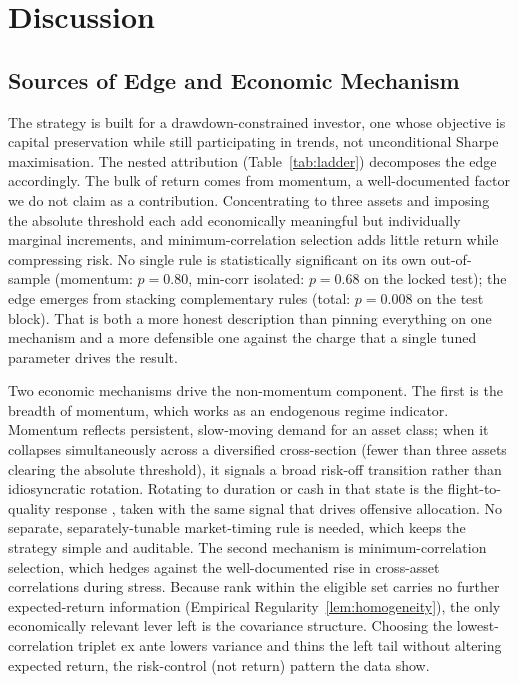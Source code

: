 \section{Discussion}
\label{sec:discussion}

\subsection{Sources of Edge and Economic Mechanism}

The strategy is built for a drawdown-constrained investor, one whose
objective is capital preservation while still participating in trends, not
unconditional Sharpe maximisation. The nested attribution
(Table~\ref{tab:ladder}) decomposes the edge accordingly. The bulk of return
comes from momentum, a well-documented factor we do not claim as a contribution.
Concentrating to three assets and imposing the absolute threshold each add
economically meaningful but individually marginal increments, and minimum-correlation
selection adds little return while compressing risk. No single
rule is statistically significant on its own out-of-sample (momentum: $p = 0.80$,
min-corr isolated: $p = 0.68$ on the locked test); the edge emerges from
stacking complementary rules (total: $p = 0.008$ on the test block). That
is both a more honest description than pinning everything on one mechanism and a
more defensible one against the charge that a single tuned parameter drives the result.

Two economic mechanisms drive the non-momentum component. The first is the breadth of
momentum, which works as an endogenous regime indicator. Momentum reflects persistent,
slow-moving demand for an asset class; when it collapses simultaneously
across a diversified cross-section (fewer than three assets clearing the absolute
threshold), it signals a broad risk-off transition rather than idiosyncratic
rotation. Rotating to duration or cash in that state is the flight-to-quality
response \citep{barroso2015, daniel2016}, taken with the same signal that
drives offensive allocation. No separate, separately-tunable market-timing rule
is needed, which keeps the strategy simple and auditable. The second mechanism is
minimum-correlation selection, which hedges against the well-documented rise in
cross-asset correlations during stress. Because rank within the eligible set carries
no further expected-return information (Empirical Regularity~\ref{lem:homogeneity}),
the only economically relevant lever left is the covariance structure. Choosing the
lowest-correlation triplet ex ante lowers variance and thins the left tail without
altering expected return, the risk-control (not return) pattern the data show.

